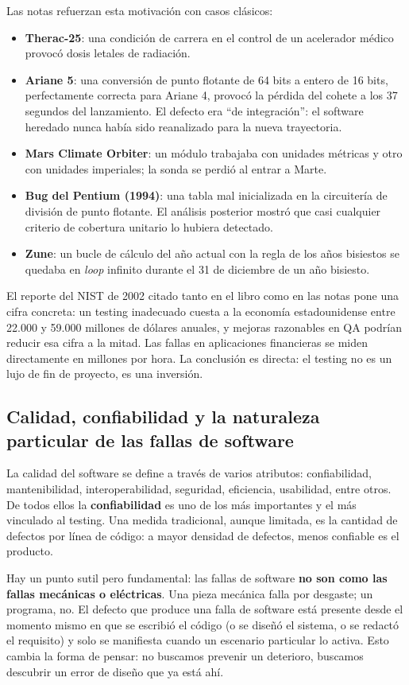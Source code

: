 \documentclass[12pt,a4paper]{article}
\begin{document}
Las notas refuerzan esta motivación con casos clásicos:
\begin{itemize}
  \item \textbf{Therac-25}: una condición de carrera en el control de un acelerador médico provocó dosis letales de radiación.
  \item \textbf{Ariane 5}: una conversión de punto flotante de 64 bits a entero de 16 bits, perfectamente correcta para Ariane 4, provocó la pérdida del cohete a los 37 segundos del lanzamiento. El defecto era ``de integración'': el software heredado nunca había sido reanalizado para la nueva trayectoria.
  \item \textbf{Mars Climate Orbiter}: un módulo trabajaba con unidades métricas y otro con unidades imperiales; la sonda se perdió al entrar a Marte.
  \item \textbf{Bug del Pentium (1994)}: una tabla mal inicializada en la circuitería de división de punto flotante. El análisis posterior mostró que casi cualquier criterio de cobertura unitario lo hubiera detectado.
  \item \textbf{Zune}: un bucle de cálculo del año actual con la regla de los años bisiestos se quedaba en \textit{loop} infinito durante el 31 de diciembre de un año bisiesto.
\end{itemize}

El reporte del NIST de 2002 citado tanto en el libro como en las notas pone una cifra concreta: un testing inadecuado cuesta a la economía estadounidense entre 22.000 y 59.000 millones de dólares anuales, y mejoras razonables en QA podrían reducir esa cifra a la mitad. Las fallas en aplicaciones financieras se miden directamente en millones por hora. La conclusión es directa: el testing no es un lujo de fin de proyecto, es una inversión.

\subsection{Calidad, confiabilidad y la naturaleza particular de las fallas de software}
La calidad del software se define a través de varios atributos: confiabilidad, mantenibilidad, interoperabilidad, seguridad, eficiencia, usabilidad, entre otros. De todos ellos la \textbf{confiabilidad} es uno de los más importantes y el más vinculado al testing. Una medida tradicional, aunque limitada, es la cantidad de defectos por línea de código: a mayor densidad de defectos, menos confiable es el producto.

Hay un punto sutil pero fundamental: las fallas de software \textbf{no son como las fallas mecánicas o eléctricas}. Una pieza mecánica falla por desgaste; un programa, no. El defecto que produce una falla de software está presente desde el momento mismo en que se escribió el código (o se diseñó el sistema, o se redactó el requisito) y solo se manifiesta cuando un escenario particular lo activa. Esto cambia la forma de pensar: no buscamos prevenir un deterioro, buscamos descubrir un error de diseño que ya está ahí.
\end{document}
